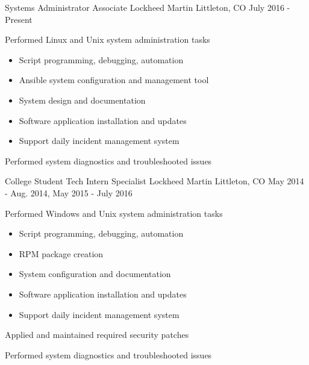 


\begin{cventries}
\vspace{-.25em}
\cventry
{Systems Administrator Associate} %
{Lockheed Martin} %
{Littleton, CO} %
{July 2016 - Present} %
{ %
\begin{cvitems}
\item {Performed Linux and Unix system administration tasks}
  \begin{itemize}
  \item{Script programming, debugging, automation}
  \item{Ansible system configuration and management tool}
  \item{System design and documentation}
  \item{Software application installation and updates}
  \item{Support daily incident management system}
  \end{itemize}
\item {Performed system diagnostics and troubleshooted issues}
\end{cvitems}
}

\vspace{-.25em}
\cventry
{College Student Tech Intern Specialist} %
{Lockheed Martin} %
{Littleton, CO} %
{May 2014 - Aug. 2014, May 2015 - July 2016} %
{ %
\begin{cvitems}
\item {Performed Windows and Unix system administration tasks}
  \begin{itemize}
  \item{Script programming, debugging, automation}
  \item{RPM package creation}
  \item{System configuration and documentation}
  \item{Software application installation and updates}
  \item{Support daily incident management system}
  \end{itemize}
\item {Applied and maintained required security patches}
\item {Performed system diagnostics and troubleshooted issues}
\end{cvitems}
}


\end{cventries}

